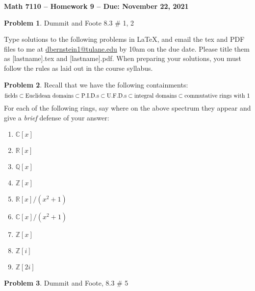 \documentclass[letterpaper,11pt]{amsart}
\theoremstyle{plain}
\theoremstyle{definition}
\newtheorem{pr}{Problem}
\theoremstyle{remark}
\begin{document}
\Large

\begin{center}
{\bf Math 7110 -- Homework  9 --  Due:  November 22, 2021}
\end{center}

\normalsize


\medskip

\color{red}

\color{black}





\begin{pr}
    Dummit and Foote 8.3 \# 1, 2
\end{pr}


\bigskip

Type solutions to the following problems in \LaTeX, and email the tex and PDF files to me at \url{dbernstein1@tulane.edu} by 10am on the due date.
Please title them as [lastname].tex and [lastname].pdf.
When preparing your solutions, you must follow the rules as laid out in the course syllabus.

\vspace{.5cm}


\begin{pr}
	Recall that we have the following containments:
	\[
		{\rm fields} \subset {\rm Euclidean \ domains} \subset {\rm P.I.D.s} \subset {\rm U.F.D.s} \subset {\rm integral\ domains} \subset {\rm commutative\ rings\ with\ } 1
	\]
	For each of the following rings, say where on the above spectrum they appear and give a \emph{brief} defense of your answer:
	\begin{enumerate}
	    \item $\mathbb{C}[x]$
	    \item $\mathbb{R}[x]$
	    \item $\mathbb{Q}[x]$
	    \item $\mathbb{Z}[x]$
	    \item $\mathbb{R}[x]/(x^2+1)$
	    \item $\mathbb{C}[x]/(x^2+1)$
	    \item $\mathbb{Z}[x]$
	    \item $\mathbb{Z}[i]$
	    \item $\mathbb{Z}[2i]$
	\end{enumerate}
\end{pr}


\begin{pr}
    Dummit and Foote, 8.3 \# 5
\end{pr}
\end{document}
